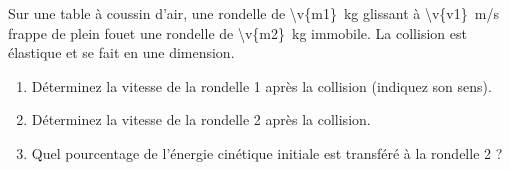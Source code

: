 Sur une table à coussin d'air, une rondelle de \qty{\v{m1}}{kg} glissant à \qty{\v{v1}}{m/s} frappe de plein fouet une rondelle de \qty{\v{m2}}{kg} immobile. La collision est élastique et se fait en une dimension.

\begin{enumerate}[label=\alph*)]
    \item Déterminez la vitesse de la rondelle 1 après la collision (indiquez son sens).
    \item Déterminez la vitesse de la rondelle 2 après la collision.
    \item Quel pourcentage de l'énergie cinétique initiale est transféré à la rondelle 2 ?
\end{enumerate}
